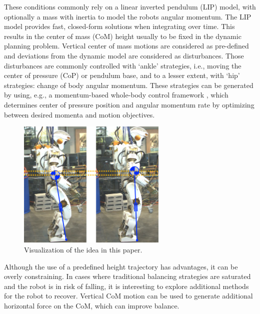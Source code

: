 \documentclass[letterpaper, 10 pt, conference]{ieeeconf}  %
\begin{document}
These conditions commonly rely on a linear inverted pendulum (LIP) model, with optionally a mass with inertia to model the robots angular momentum. The LIP model provides fast, closed-form solutions when integrating over time. This results in the center of mass (CoM) height usually to be fixed in the dynamic planning problem. Vertical center of mass motions are considered as pre-defined and deviations from the dynamic model are considered as disturbances. Those disturbances are commonly controlled with `ankle' strategies, i.e., moving the center of pressure (CoP) or pendulum base, and to a lesser extent, with `hip' strategies: change of body angular momentum. These strategies can be generated by using, e.g., a momentum-based whole-body control framework \cite{kajita2003resolved, lee2012momentum,koolen2016design}, which determines center of pressure position and angular momentum rate by optimizing between desired momenta and motion objectives.

\begin{figure}\vspace{0.25cm}
      \centering
      \includegraphics[width=2.8in]{modeltoval2_C.png} %
      \caption{Visualization of the idea in this paper. }
      \label{fig:modeltoval2}
\end{figure}

Although the use of a predefined height trajectory has advantages, it can be overly constraining. In cases where traditional balancing strategies are saturated and the robot is in risk of falling, it is interesting to explore additional methods for the robot to recover. Vertical CoM motion can be used to generate additional horizontal force on the CoM, which can improve balance.
\end{document}
